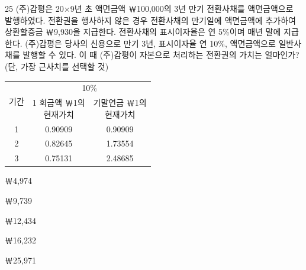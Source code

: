 \begin{question}{25}
(주)감평은 20×9년 초 액면금액 ￦100,000의 3년 만기 전환사채를 액면금액으로 발행하였다. 전환권을 행사하지 않은 경우 전환사채의 만기일에 액면금액에 추가하여 상환할증금 ￦9,930을 지급한다. 전환사채의 표시이자율은 연 5\%이며 매년 말에 지급한다. (주)감평은 당사의 신용으로 만기 3년, 표시이자율 연 10\%, 액면금액으로 일반사채를 발행할 수 있다. 이 때 (주)감평이 자본으로 처리하는 전환권의 가치는 얼마인가? (단, 가장 근사치를 선택할 것)
\begin{center}
\small
\begin{tabular}{|c|c|c|}
\hline
\multirow{2}{*}{기간} & \multicolumn{2}{c|}{10\%} \\
\cline{2-3}
 & \makecell{1 회금액 ￦1의\\현재가치} & \makecell{기말연금 ￦1의\\현재가치} \\
\hline
1 & 0.90909 & 0.90909 \\
\hline
2 & 0.82645 & 1.73554 \\
\hline
3 & 0.75131 & 2.48685 \\
\hline
\end{tabular}
\end{center}
\begin{choices}
  \item ￦4,974
  \item ￦9,739
  \item ￦12,434
  \item ￦16,232
  \item ￦25,971
\end{choices}
\end{question}
